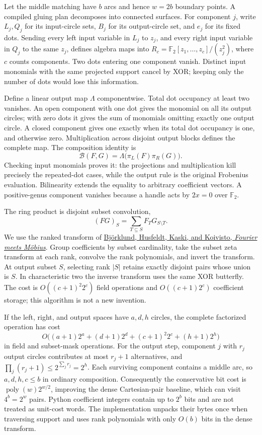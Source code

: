 Let the middle matching have $b$ arcs and hence $w=2b$ boundary points.
A compiled gluing plan decomposes into connected surfaces. For component
$j$, write $L_j,Q_j$ for its input-circle sets, $B_j$ for its output-circle
set, and $e_j$ for its fixed dots. Sending every left input variable in
$L_j$ to $z_j$, and every right input variable in $Q_j$ to the same $z_j$,
defines algebra maps into
$R_c=\mathbb F_2[z_1,\ldots,z_c]/(z_j^2)$, where $c$ counts components.
Two dots entering one component vanish. Distinct input monomials with
the same projected support cancel by XOR; keeping only the number of
dots would lose this information.

Define a linear output map $\Lambda$ componentwise. Total dot occupancy
at least two vanishes. An open component with one dot gives the monomial
on all its output circles; with zero dots it gives the sum of monomials
omitting exactly one output circle. A closed component gives one exactly
when its total dot occupancy is one, and otherwise zero. Multiplication
across disjoint output blocks defines the complete map. The composition
identity is
\[
 \mathcal B(F,G)=\Lambda\bigl(\pi_L(F)\pi_R(G)\bigr).
\]
Checking input monomials proves it: the projections and multiplication
kill precisely the repeated-dot cases, while the output rule is the
original Frobenius evaluation. Bilinearity extends the equality to
arbitrary coefficient vectors. A positive-genus component vanishes
because a handle acts by $2x=0$ over $\mathbb F_2$.

The ring product is disjoint subset convolution,
\[
 (FG)_S=\sum_{T\subseteq S}F_TG_{S\setminus T}.
\]
We use the ranked transform of
\href{https://arxiv.org/abs/cs/0611101}{Bj\"orklund, Husfeldt, Kaski,
and Koivisto, \emph{Fourier meets M\"obius}}. Group coefficients by
subset cardinality, take the subset zeta transform at each rank,
convolve the rank polynomials, and invert the transform. At output
subset $S$, selecting rank $|S|$ retains exactly disjoint pairs whose
union is $S$. In characteristic two the inverse transform uses the
same XOR butterfly. The cost is $O((c+1)^2 2^c)$ field operations and
$O((c+1)2^c)$ coefficient storage; this algorithm is not a new invention.

If the left, right, and output spaces have $a,d,h$ circles, the complete
factorized operation has cost
\[
 O\bigl((a+1)2^a+(d+1)2^d+(c+1)^2 2^c+(h+1)2^h\bigr)
\]
in field and subset-mask operations. For the output step, component
$j$ with $r_j$ output circles contributes at most $r_j+1$ alternatives,
and $\prod_j(r_j+1)\le 2^{\sum_jr_j}=2^h$. Each surviving component
contains a middle arc, so $a,d,h,c\le b$ in ordinary composition.
Consequently the conservative bit cost is
$\operatorname{poly}(w)2^{w/2}$, improving the dense Cartesian-pair
baseline, which can visit $4^b=2^w$ pairs. Python coefficient integers
contain up to $2^b$ bits and are not treated as unit-cost words. The
implementation unpacks their bytes once when traversing support and
uses rank polynomials with only $O(b)$ bits in the dense transform.

